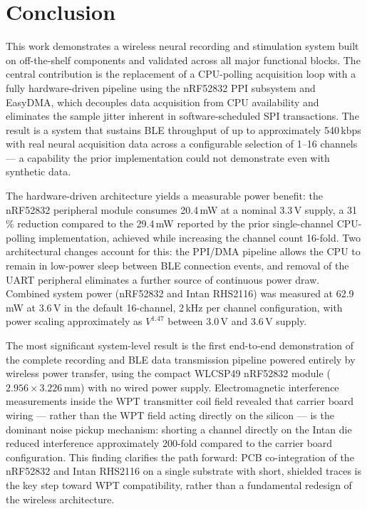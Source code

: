 \section{Conclusion}

This work demonstrates a wireless neural recording and stimulation system
built on off-the-shelf components and validated across all major functional blocks.
The central contribution is the replacement of a CPU-polling acquisition loop with a
fully hardware-driven pipeline using the nRF52832 PPI subsystem and EasyDMA, which
decouples data acquisition from CPU availability and eliminates the sample jitter
inherent in software-scheduled SPI transactions. The result is a system that sustains
BLE throughput of up to approximately 540\,kbps with real neural acquisition data
across a configurable selection of 1--16 channels --- a capability the prior
implementation could not demonstrate even with synthetic data.

The hardware-driven architecture yields a measurable power benefit: the nRF52832
peripheral module consumes 20.4\,mW at a nominal 3.3\,V supply, a 31\,\% reduction
compared to the 29.4\,mW reported by the prior single-channel CPU-polling
implementation, achieved while increasing the channel count 16-fold. Two architectural
changes account for this: the PPI/DMA pipeline allows the CPU to remain in low-power
sleep between BLE connection events, and removal of the UART peripheral eliminates a
further source of continuous power draw. Combined system power (nRF52832 and Intan
RHS2116) was measured at 62.9\,mW at 3.6\,V in the default 16-channel, 2\,kHz
per channel configuration, with power scaling approximately as $V^{1.47}$ between
3.0\,V and 3.6\,V supply.

The most significant system-level result is the first end-to-end demonstration of
the complete recording and BLE data transmission pipeline powered entirely by
wireless power transfer, using the compact WLCSP49 nRF52832 module
($2.956 \times 3.226$\,mm) with no wired power supply. Electromagnetic interference measurements
inside the WPT transmitter coil field revealed that carrier board wiring --- rather
than the WPT field acting directly on the silicon --- is the dominant noise pickup
mechanism: shorting a channel directly on the Intan die reduced interference
approximately 200-fold compared to the carrier board
configuration. This finding clarifies the path forward: PCB co-integration of the
nRF52832 and Intan RHS2116 on a single substrate with short, shielded traces is the
key step toward WPT compatibility, rather than a fundamental redesign of the wireless
architecture.

